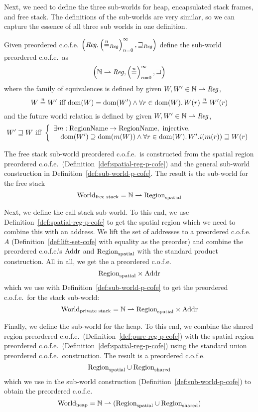 \begin{jversion}
Next, we need to define the three sub-worlds for heap, encapsulated stack frames, and free stack.
The definitions of the sub-worlds are very similar, so we can capture the essence of all three sub worlds in one definition.
\begin{definition}
  \label{def:sub-world-p-cofe}
  Given preordered c.o.f.e. $\left(\var{Reg},\left(\nequal[n]_\var{Reg}\right)_{n=0}^{\infty},\future_\var{Reg}\right)$ define the sub-world preordered c.o.f.e.\ as
  \[
    \left(\nats \parfun \var{Reg},\left(\nequal[n]\right)_{n=0}^{\infty},\future \right)
  \]
  where the family of equivalences is defined by given $W,W' \in \nats \parfun \var{Reg}$,
  \[
    W \nequal W' \text{ iff } \dom(W) = \dom(W') \wedge \forall r \in \dom(W)\ldotp W(r) \nequal W'(r)
  \]
  and the future world relation is defined by given $W,W' \in \nats \parfun \var{Reg}$,
  \[
  W' \future W \text{ iff } \left\{
    \array{l}
    \exists m : \RegionName \fun \RegionName, \text{ injective}\ldotp\\
    \quad \dom(W') \supseteq \dom(m(W)) \wedge \forall r \in \dom(W)\ldotp W'.i(m(r)) \future W(r)
     \endarray
  \right.
\]
\end{definition}
The free stack sub-world preordered c.o.f.e.\ is constructed from the spatial region preordered c.o.f.e.\ (Definition~\ref{def:spatial-reg-p-cofe}) and the general sub-world construction in Definition~\ref{def:sub-world-p-cofe}.
The result is the sub-world for the free stack
\[
  \Worldfs = \nats \parfun \Regions
\]

Next, we define the call stack sub-world.
To this end, we use Definition~\ref{def:spatial-reg-p-cofe} to get the spatial region which we need to combine this with an address.
We lift the set of addresses to a preordered c.o.f.e.\ $A$ (Definition~\ref{def:lift-set-cofe} with equality as the preorder) and combine the preordered c.o.f.e.'s $\Addr$ and $\Regions$ with the standard product construction.
All in all, we get the a preordered c.o.f.e.\
\[
  \Regions \times \Addr
\]
which we use with Definition~\ref{def:sub-world-p-cofe} to get the preordered c.o.f.e.\ for the stack sub-world:
\[
  \Worlds = \nats \parfun \Regions \times \Addr
\]

Finally, we define the sub-world for the heap.
To this end, we combine the shared region preordered c.o.f.e.\ (Definition~\ref{def:pure-reg-p-cofe}) with the spatial region preordered c.o.f.e.\ (Definition~\ref{def:spatial-reg-p-cofe}) using the standard union preordered c.o.f.e.\ construction.
The result is a preordered c.o.f.e.\
\[
  \Regions \cup \Regionh
\]
which we use in the sub-world construction (Definition~\ref{def:sub-world-p-cofe}) to obtain the preordered c.o.f.e.\
\[
  \Worldh = \nats \parfun (\Regions \cup \Regionh)
\]


\end{jversion}
